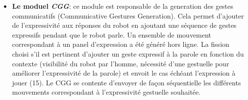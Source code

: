 \documentclass[a4paper,11pt,twoside]{StyleThese}
\begin{document}
\begin{itemize}
\item \textbf{Le moduel \textit{CGG}}: ce module est responsable de la generation des gestes communicatifs (Communicative Gestures Generation). Cela permet d'ajouter de l'expressivité aux réponses du robot en ajoutant une séquence de gestes expressifs pendant que le robot parle. Un ensemble de mouvement correspondant à un panel d'expression a été généré hors ligne. La fission choisi s'il est pertinent d'ajouter un geste expressif à la parole en fonction du contexte (visibilité du robot par l'homme, nécessité d'une gestuelle pour améliorer l'expressivité de la parole) et envoit le cas échéant l'expression à jouer (15). Le CGG se contente d'envoyer de façon séquentielle les différents mouvements correspondant à l'expressivité gestuelle souhaitée.
\end{itemize}

\end{document}
